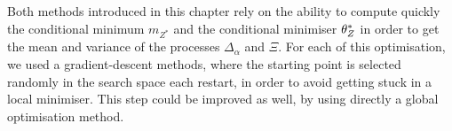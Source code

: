 \documentclass[../../Main_ManuscritThese.tex]{subfiles}
\begin{document}
Both methods introduced in this chapter rely on the ability to compute
quickly the conditional minimum $m_{Z^*}$ and the conditional
minimiser $\theta_Z^*$ in order to get the mean and variance of the
processes $\Delta_\alpha$ and $\Xi$. For each of this optimisation, we
used a gradient-descent methods, where the starting point is selected
randomly in the search space each restart, in order to avoid getting
stuck in a local minimiser. This step could be improved as well, by
using directly a global optimisation
method.%


\markchapterend


\subfileLocal{
	\pagestyle{empty}
	
	
}
\end{document}
